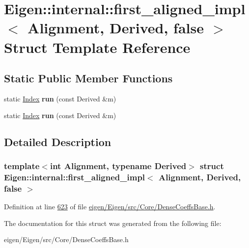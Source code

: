 \hypertarget{struct_eigen_1_1internal_1_1first__aligned__impl_3_01_alignment_00_01_derived_00_01false_01_4}{}\section{Eigen\+:\+:internal\+:\+:first\+\_\+aligned\+\_\+impl$<$ Alignment, Derived, false $>$ Struct Template Reference}
\label{struct_eigen_1_1internal_1_1first__aligned__impl_3_01_alignment_00_01_derived_00_01false_01_4}
\subsection*{Static Public Member Functions}
\begin{DoxyCompactItemize}
\item 
\mbox{\label{struct_eigen_1_1internal_1_1first__aligned__impl_3_01_alignment_00_01_derived_00_01false_01_4_a6bcfd273a6d60345207910363afddf1b}} 
static \hyperlink{namespace_eigen_a62e77e0933482dafde8fe197d9a2cfde}{Index} {\bfseries run} (const Derived \&m)
\item 
\mbox{\label{struct_eigen_1_1internal_1_1first__aligned__impl_3_01_alignment_00_01_derived_00_01false_01_4_a6bcfd273a6d60345207910363afddf1b}} 
static \hyperlink{namespace_eigen_a62e77e0933482dafde8fe197d9a2cfde}{Index} {\bfseries run} (const Derived \&m)
\end{DoxyCompactItemize}


\subsection{Detailed Description}
\subsubsection*{template$<$int Alignment, typename Derived$>$\newline
struct Eigen\+::internal\+::first\+\_\+aligned\+\_\+impl$<$ Alignment, Derived, false $>$}



Definition at line \hyperlink{eigen_2_eigen_2src_2_core_2_dense_coeffs_base_8h_source_l00623}{623} of file \hyperlink{eigen_2_eigen_2src_2_core_2_dense_coeffs_base_8h_source}{eigen/\+Eigen/src/\+Core/\+Dense\+Coeffs\+Base.\+h}.



The documentation for this struct was generated from the following file\+:\begin{DoxyCompactItemize}
\item 
eigen/\+Eigen/src/\+Core/\+Dense\+Coeffs\+Base.\+h\end{DoxyCompactItemize}
